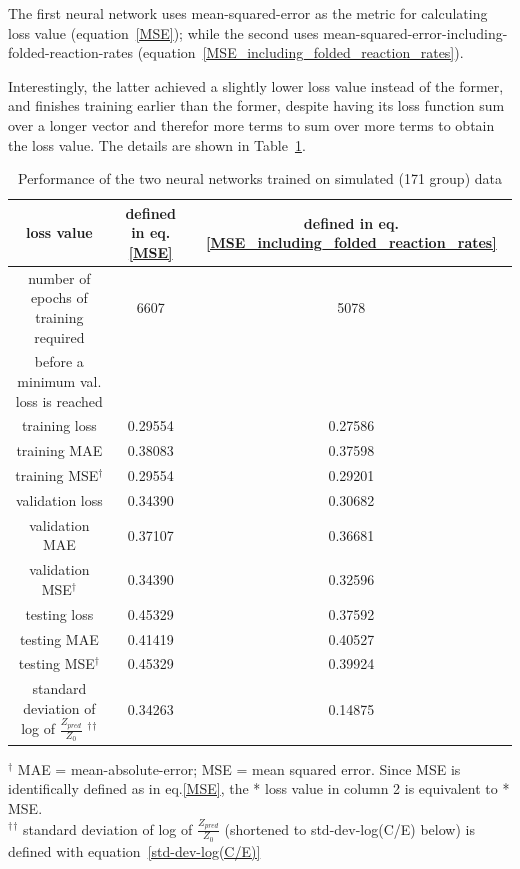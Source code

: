 \documentclass[a4paper, 12pt]{article}
\begin{document}
The first neural network uses mean-squared-error as the metric for calculating loss value (equation~\ref{MSE}); while the second uses mean-squared-error-including-folded-reaction-rates (equation~\ref{MSE_including_folded_reaction_rates}). 

Interestingly, the latter achieved a slightly lower loss value instead of the former, and finishes training earlier than the former, despite having its loss function sum over a longer vector and therefor more terms to sum over more terms to obtain the loss value. The details are shown in Table~\ref{SimulatedLoss}.

\begin{table}
\begin{tabular}{ccc}
loss value & defined in eq. \ref{MSE} & defined in eq. \ref{MSE_including_folded_reaction_rates}\\
\hline
number of epochs of training required & 6607 & 5078 \\
before a minimum val. loss is reached\\
training loss & 0.29554 & 0.27586 \\
training MAE & 0.38083 & 0.37598 \\
training MSE${}^\dagger$ & 0.29554 & 0.29201 \\
validation loss & 0.34390 & 0.30682 \\
validation MAE & 0.37107 & 0.36681 \\
validation MSE${}^\dagger$ & 0.34390 & 0.32596 \\
testing loss & 0.45329 & 0.37592 \\
testing MAE & 0.41419 & 0.40527 \\
testing MSE${}^\dagger$ & 0.45329 & 0.39924 \\
standard deviation of log of $\frac{Z_{pred}}{Z_{0}}$ ${}^\dagger$${}^\dagger$ & 0.34263 & 0.14875\\
\end{tabular}
\caption{Performance of the two neural networks trained on simulated (171 group) data}\label{SimulatedLoss}
${}^\dagger$ MAE = mean-absolute-error; MSE = mean squared error. Since MSE is identifically defined as in eq.\ref{MSE}, the * loss value in column 2 is equivalent to * MSE.\\
${}^\dagger$${}^\dagger$ standard deviation of log of $\frac{Z_{pred}}{Z_{0}}$ (shortened to std-dev-log(C/E) below) is defined with equation~\ref{std-dev-log(C/E)}
\end{table}
\end{document}
